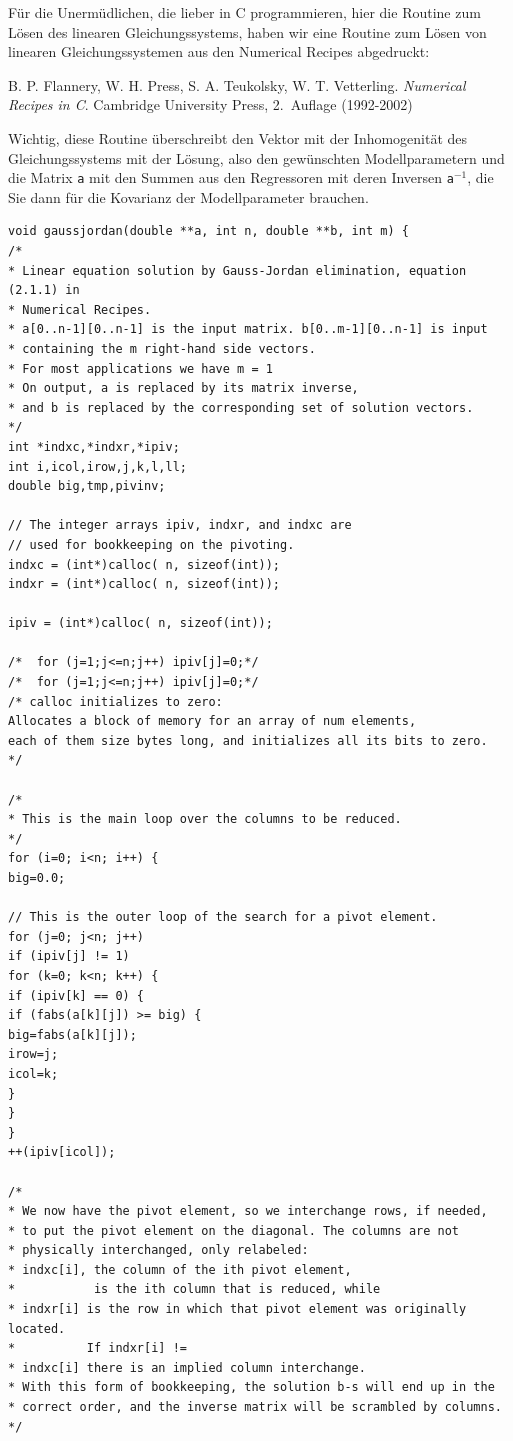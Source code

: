 Für die Unermüdlichen, die lieber in C programmieren, hier die Routine zum Lösen
des linearen Gleichungssystems, haben wir eine Routine zum Lösen von linearen
Gleichungssystemen aus den Numerical Recipes abgedruckt:

B. P. Flannery, W. H. Press, S. A. Teukolsky, W. T. Vetterling. \textsl{Numerical Recipes
in C}. Cambridge University Press, 2.~Auflage (1992-2002)

Wichtig, diese Routine überschreibt den Vektor mit der Inhomogenität des Gleichungssystems
mit der Lösung, also den gewünschten Modellparametern und
die Matrix \texttt{a} mit den Summen aus den Regressoren mit deren Inversen
\texttt{a}$^{-1}$, die Sie dann für die Kovarianz der Modellparameter brauchen.

\begin{verbatim}
void gaussjordan(double **a, int n, double **b, int m) {
/*
* Linear equation solution by Gauss-Jordan elimination, equation (2.1.1) in
* Numerical Recipes.
* a[0..n-1][0..n-1] is the input matrix. b[0..m-1][0..n-1] is input
* containing the m right-hand side vectors.
* For most applications we have m = 1
* On output, a is replaced by its matrix inverse,
* and b is replaced by the corresponding set of solution vectors.
*/
int *indxc,*indxr,*ipiv;
int i,icol,irow,j,k,l,ll;
double big,tmp,pivinv;

// The integer arrays ipiv, indxr, and indxc are
// used for bookkeeping on the pivoting.
indxc = (int*)calloc( n, sizeof(int));
indxr = (int*)calloc( n, sizeof(int));

ipiv = (int*)calloc( n, sizeof(int));

/*	for (j=1;j<=n;j++) ipiv[j]=0;*/
/*	for (j=1;j<=n;j++) ipiv[j]=0;*/
/* calloc initializes to zero:
Allocates a block of memory for an array of num elements,
each of them size bytes long, and initializes all its bits to zero.
*/

/*
* This is the main loop over the columns to be reduced.
*/
for (i=0; i<n; i++) {
big=0.0;

// This is the outer loop of the search for a pivot element.
for (j=0; j<n; j++)
if (ipiv[j] != 1)
for (k=0; k<n; k++) {
if (ipiv[k] == 0) {
if (fabs(a[k][j]) >= big) {
big=fabs(a[k][j]);
irow=j;
icol=k;
}
}
}
++(ipiv[icol]);

/*
* We now have the pivot element, so we interchange rows, if needed,
* to put the pivot element on the diagonal. The columns are not
* physically interchanged, only relabeled:
* indxc[i], the column of the ith pivot element,
*           is the ith column that is reduced, while
* indxr[i] is the row in which that pivot element was originally located.
*          If indxr[i] !=
* indxc[i] there is an implied column interchange.
* With this form of bookkeeping, the solution b-s will end up in the
* correct order, and the inverse matrix will be scrambled by columns.
*/


\end{verbatim}
